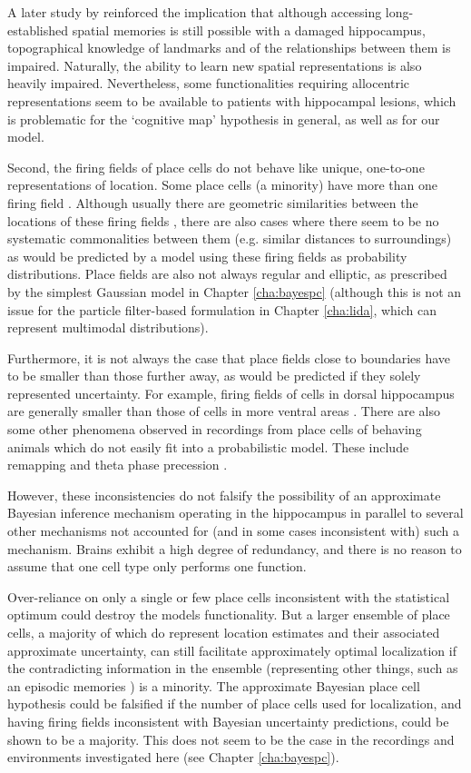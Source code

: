 A later study by \cite{maguire2006} reinforced the implication that although accessing long-established spatial memories is still possible with a damaged hippocampus, topographical knowledge of landmarks and of the relationships between them is impaired. Naturally, the ability to learn new spatial representations is also heavily impaired. Nevertheless, some functionalities requiring allocentric representations seem to be available to patients with hippocampal lesions, which is problematic for the `cognitive map' hypothesis in general, as well as for our model.

Second, the firing fields of place cells do not behave like unique, one-to-one representations of location. Some place cells (a minority) have more than one firing field \citep{burke2011influence}. Although usually there are geometric similarities between the locations of these firing fields \citep{barry2006boundary}, there are also cases where there seem to be no systematic commonalities \citep{park2011ensemble} between them (e.g. similar distances to surroundings) as would be predicted by a model using these firing fields as probability distributions. Place fields are also not always regular and elliptic, as prescribed by the simplest Gaussian model in Chapter \ref{cha:bayespc} (although this is not an issue for the particle filter-based formulation in Chapter \ref{cha:lida}, which can represent multimodal distributions). 

Furthermore, it is not always the case that place fields close to boundaries have to be smaller than those further away, as would be predicted if they solely represented uncertainty. For example, firing fields of cells in dorsal hippocampus are generally smaller than those of cells in more ventral areas \citep{kjelstrup2008finite}. There are also some other phenomena observed in recordings from place cells of behaving animals which do not easily fit into a probabilistic model. These include remapping \citep{colgin2008understanding} and theta phase precession \citep{skaggs1996theta}.

However, these inconsistencies do not falsify the possibility of an approximate Bayesian inference mechanism operating in the hippocampus in parallel to several other mechanisms not accounted for (and in some cases inconsistent with) such a mechanism. Brains exhibit a high degree of redundancy, and there is no reason to assume that one cell type only performs one function. 

Over-reliance on only a single or few place cells inconsistent with the statistical optimum could destroy the models functionality. But a larger ensemble of place cells, a majority of which do represent location estimates and their associated approximate uncertainty, can still facilitate approximately optimal localization if the contradicting information in the ensemble (representing other things, such as an episodic memories \citep{tulving1998episodic}) is a minority. The approximate Bayesian place cell hypothesis could be falsified if the number of place cells used for localization, and having firing fields inconsistent with Bayesian uncertainty predictions, could be shown to be a majority. This does not seem to be the case in the recordings and environments investigated here (see Chapter \ref{cha:bayespc}).

